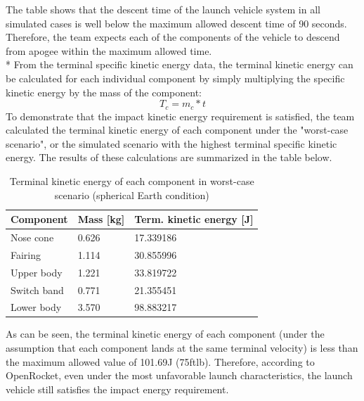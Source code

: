 The table shows that the descent time of the launch vehicle system in all simulated cases is well below the maximum allowed descent time of 90 seconds. Therefore, the team expects each of the components of the vehicle to descend from apogee within the maximum allowed time.
\\*
\newline
From the terminal specific kinetic energy data, the terminal kinetic energy can be calculated for each individual component by simply multiplying the specific kinetic energy by the mass of the component:
 \begin{equation}
    T{_c} = m{_c}*t    
 \end{equation}
To demonstrate that the impact kinetic energy requirement is satisfied, the team calculated the terminal kinetic energy of each component under the "worst-case scenario", or the simulated scenario with the highest terminal specific kinetic energy.  The results of these calculations are summarized in the table below.

\begin{table}[H]
\centering
\caption{Terminal kinetic energy of each component in worst-case scenario (spherical Earth condition)}
\label{tab:FlightDynamics:TerminalKineticEnergy}
\begin{tabularx}{.5\linewidth}{XlX}
\toprule
  \textbf{Component} & \textbf{Mass [kg]} &  \textbf{Term. kinetic energy [J]} \\
\midrule
Nose cone & 0.626 &             17.339186 \\
Fairing & 1.114 &             30.855996 \\
Upper body & 1.221 &             33.819722 \\
Switch band & 0.771 &             21.355451 \\
Lower body & 3.570 &             98.883217 \\
\bottomrule
\end{tabularx}
\end{table}

As can be seen, the terminal kinetic energy of each component (under the assumption that each component lands at the same terminal velocity) is less than the maximum allowed value of 101.69J (75ftlb). Therefore, according to OpenRocket, even under the most unfavorable launch characteristics, the launch vehicle still satisfies the impact energy requirement.

